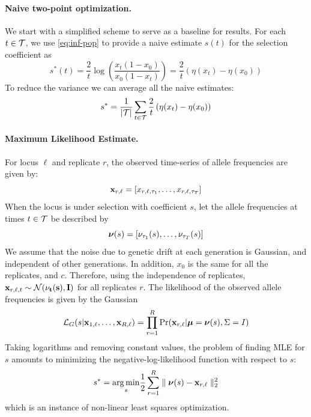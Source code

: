 \documentclass[11pt]{article}
\begin{document}
\begin{enumerate}[I.]
\paragraph{Naive two-point optimization.} We start with a simplified
scheme to serve as a baseline for results.  For each $t\in {\cal T}$, we
use \eqref{eq:inf-pop} to provide a naive estimate $s(t)$ for the
selection coefficient as
\begin{equation}
	s^*(t)=\frac{2}{t} \log \left( \frac{x_t(1-x_0)}{x_0 (1-x_t)} \right) = \frac{2}{t}  
	\left( \eta(x_t)-\eta(x_0)\right)
	\label{eq:naive2point}
\end{equation}
To reduce the variance we can average all the naive estimates: 
\begin{equation}
	s^*=\frac{1}{|{\cal T}|}\sum_{t\in {\cal T}}\frac{2}{t}  \left( \eta(x_t)-\eta(x_0)\right)
	\label{eq:naive}
\end{equation}


\paragraph{Maximum Likelihood Estimate.}
For locus $\ell$  and replicate $r$, the observed time-series of 
allele frequencies are given by:
\[
{{\mathbf x}_{r,\ell}} = [x_{r,\ell,\tau_1},\ldots,x_{r,\ell,\tau_T}]
\]
When the locus is under selection with coefficient $s$, let the allele
frequencies at times $t\in {\cal T}$ be described by
\[
{\boldsymbol\nu}(s) = [\nu_{\tau_1}(s),\ldots,\nu_{\tau_T}(s)]
\]
We assume that the noise due to genetic drift at each generation is
Gaussian, and independent of other generations. In addition, $x_0$ is
the same for all the replicates, and $c$. Therefore, using the
independence of replicates, ${\mathbf x}_{r,\ell,t} \sim {\cal N}(\bf\nu_t(s),I)$
for all replicates $r$. The likelihood of the observed allele
frequencies is given by the Gaussian
\begin{equation}
	{\cal L}_G(s|{\mathbf x}_{1,\ell}, \dots,{\mathbf x}_{R,\ell}) = \prod_{r=1}^R \Pr({\mathbf x}_{r,\ell}| 
	{\boldsymbol\mu}={\boldsymbol\nu}(s),
	\Sigma= I) 
\end{equation}
Taking logarithms and removing constant values, the problem of finding
MLE for $s$ amounts to minimizing the negative-log-likelihood function
with respect to $s$: 
\begin{equation}
	s^*=\underset{s}{\arg \min} \frac{1}{2} \sum_{r=1}^R \parallel 
	{{\boldsymbol\nu}(s) -
		{\mathbf x}_{r,\ell}} \parallel_2^2
	\label{eq:nlls0}
\end{equation}
which is an instance of non-linear least squares optimization.

\end{enumerate}
\end{document}
